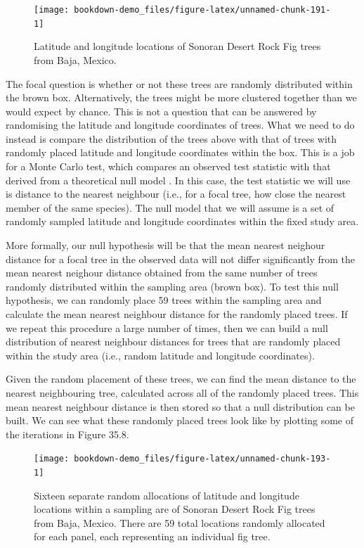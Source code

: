 \documentclass[
]{scrbook}
\begin{document}
\begin{figure}
\texttt{[image: bookdown-demo\_files/figure-latex/unnamed-chunk-191-1]} \caption{Latitude and longitude locations of Sonoran Desert Rock Fig trees from Baja, Mexico.}\label{fig:unnamed-chunk-191}
\end{figure}

The focal question is whether or not these trees are randomly distributed within the brown box.
Alternatively, the trees might be more clustered together than we would expect by chance.
This is not a question that can be answered by randomising the latitude and longitude coordinates of trees.
What we need to do instead is compare the distribution of the trees above with that of trees with randomly placed latitude and longitude coordinates within the box.
This is a job for a Monte Carlo test, which compares an observed test statistic with that derived from a theoretical null model \citep{Manly2007}.
In this case, the test statistic we will use is distance to the nearest neighbour (i.e., for a focal tree, how close the nearest member of the same species).
The null model that we will assume is a set of randomly sampled latitude and longitude coordinates within the fixed study area.

More formally, our null hypothesis will be that the mean nearest neighour distance for a focal tree in the observed data will not differ significantly from the mean nearest neighour distance obtained from the same number of trees randomly distributed within the sampling area (brown box).
To test this null hypothesis, we can randomly place 59 trees within the sampling area and calculate the mean nearest neighbour distance for the randomly placed trees.
If we repeat this procedure a large number of times, then we can build a null distribution of nearest neighbour distances for trees that are randomly placed within the study area (i.e., random latitude and longitude coordinates).

Given the random placement of these trees, we can find the mean distance to the nearest neighbouring tree, calculated across all of the randomly placed trees.
This mean nearest neighbour distance is then stored so that a null distribution can be built.
We can see what these randomly placed trees look like by plotting some of the iterations in Figure 35.8.

\begin{figure}
\texttt{[image: bookdown-demo\_files/figure-latex/unnamed-chunk-193-1]} \caption{Sixteen separate random allocations of latitude and longitude locations within a sampling  are of Sonoran Desert Rock Fig trees from Baja, Mexico. There are 59 total locations randomly allocated for each panel, each representing an individual fig tree.}\label{fig:unnamed-chunk-193}
\end{figure}
\end{document}
